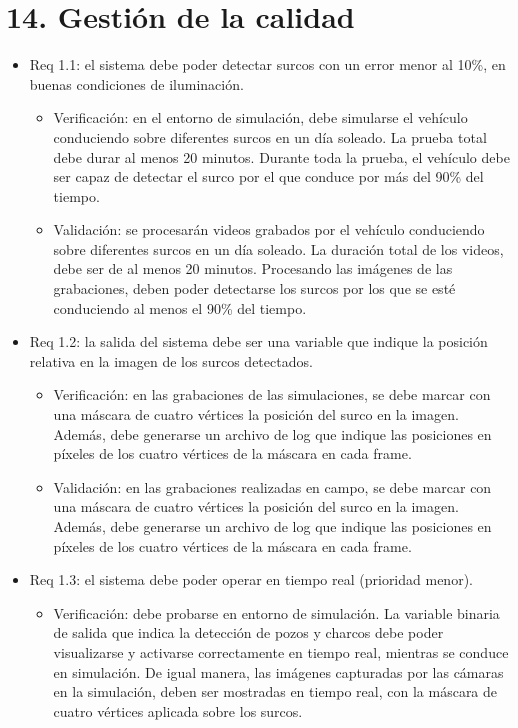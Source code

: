 \documentclass[
11pt, %
codirector, %
]{charter}
\begin{document}
\section{14. Gestión de la calidad}
\label{sec:calidad}

\begin{itemize}
	
	\item Req 1.1: el sistema debe poder detectar surcos con un error menor al 10\%, en buenas condiciones de iluminación.
	\begin{itemize}
		\item Verificación: en el entorno de simulación, debe simularse el vehículo conduciendo sobre diferentes surcos en un día soleado. La prueba total debe durar al menos 20 minutos. Durante toda la prueba, el vehículo debe ser capaz de detectar el surco por el que conduce por más del 90\% del tiempo.
		\item Validación: se procesarán videos grabados por el vehículo conduciendo sobre diferentes surcos en un día soleado. La duración total de los videos, debe ser de al menos 20 minutos. Procesando las imágenes de las grabaciones, deben poder detectarse los surcos por los que se esté conduciendo al menos el 90\% del tiempo.
	\end{itemize}
	\item Req 1.2: la salida del sistema debe ser una variable que indique la posición relativa en la imagen de los surcos detectados.
	\begin{itemize}
		\item Verificación: en las grabaciones de las simulaciones, se debe marcar con una máscara de cuatro vértices la posición del surco en la imagen. Además, debe generarse un archivo de log que indique las posiciones en píxeles de los cuatro vértices de la máscara en cada frame.
		\item Validación: en las grabaciones realizadas en campo, se debe marcar con una máscara de cuatro vértices la posición del surco en la imagen. Además, debe generarse un archivo de log que indique las posiciones en píxeles de los cuatro vértices de la máscara en cada frame.
	\end{itemize}
	\item Req 1.3: el sistema debe poder operar en tiempo real (prioridad menor).
	\begin{itemize}
		\item Verificación: debe probarse en entorno de simulación. La variable binaria de salida que indica la detección de pozos y charcos debe poder visualizarse y activarse correctamente en tiempo real, mientras se conduce en simulación. De igual manera, las imágenes capturadas por las cámaras en la simulación, deben ser mostradas en tiempo real, con la máscara de cuatro vértices aplicada sobre los surcos.

\end{itemize}
\end{itemize}
\end{document}
